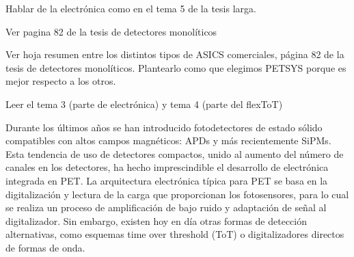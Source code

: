 Hablar de la electrónica como en el tema 5 de la tesis larga.

Ver pagina 82 de la tesis de detectores monolíticos

Ver hoja resumen entre los distintos tipos de ASICS comerciales, página 82 de la tesis de detectores monolíticos. Plantearlo como que elegimos PETSYS porque es mejor respecto a los otros.

Leer el tema 3 (parte de electrónica) y tema 4 (parte del flexToT)

Durante los últimos años se han introducido fotodetectores de estado sólido compatibles con altos campos magnéticos: APDs y más recientemente SiPMs. Esta tendencia de uso de detectores compactos, unido al aumento del número de canales en los detectores, ha hecho imprescindible el desarrollo de electrónica integrada en PET. La arquitectura electrónica típica para PET se basa en la digitalización y lectura de la carga que proporcionan los fotosensores, para lo cual se realiza un proceso de amplificación de bajo ruido y adaptación de señal al digitalizador. Sin embargo, existen hoy en día otras formas de detección alternativas, como esquemas time over threshold (ToT) o digitalizadores directos de formas de onda.                                                                                                                                                                                                                                                                                                                                                                                                                                                                                                                                                                                                                                                                                                                                                                                                                                                                                                                                                                                                                                                